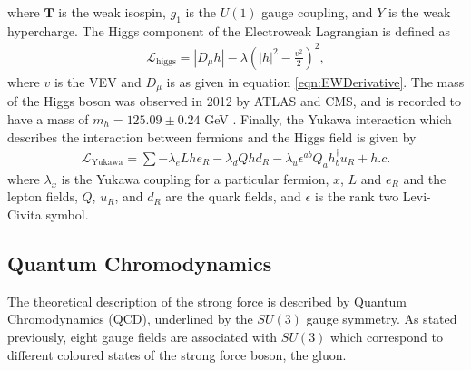 where $\textbf{T}$ is the weak isospin, $g_{1}$ is the $U(1)$ gauge coupling, and $Y$ is the weak hypercharge.
The Higgs component of the Electroweak Lagrangian is defined as 
\begin{align}
\mathcal{L}_{\textrm{higgs}} = \left| D_{\mu} h \right| -\lambda \left( \left| h \right|^{2} - \frac{v^{2}}{2} \right)^{2},
\end{align}
where $v$ is the VEV and $D_{\mu}$ is as given in equation \ref{eqn:EWDerivative}. 
The mass of the Higgs boson was observed in 2012 by ATLAS and CMS, and is recorded to have a mass of $m_{h} = 125.09 \pm 0.24$ GeV \cite{aad2012observation, chatrchyan2012observation}.
Finally, the Yukawa interaction which describes the interaction between fermions and the Higgs field is given by
\begin{align}
\mathcal{L}_{\textrm{Yukawa}} = \sum -\lambda_{e} \bar{L} h e_{R} - \lambda_{d} \bar{Q} h d_{R} - \lambda_{u} \epsilon^{ab}\bar{Q}_{a} h^{\dagger}_{b} u_{R} + h.c.
\end{align}
where $\lambda_{x}$ is the Yukawa coupling for a particular fermion, $x$, $L$ and $e_{R}$ and the lepton fields, $Q$, $u_{R}$, and $d_{R}$ are the quark fields, and $\epsilon$ is the rank two Levi-Civita symbol.

\subsection{Quantum Chromodynamics}
The theoretical description of the strong force is described by Quantum Chromodynamics (QCD), underlined by the $SU(3)$ gauge symmetry. 
As stated previously, eight gauge fields are associated with $SU(3)$ which correspond to different coloured states of the strong force boson, the gluon.

